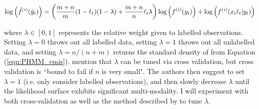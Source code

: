 \begin{equation}
    \log\left(\tilde{f}^{(i)}(\tilde{y}_t)\right) = \left(\frac{m+n}{m}(1-\ell_t)(1-\lambda) + \frac{m+n}{n}\ell_t\lambda\right)  \log\left(f^{(i)}(y_t)\right) + \log \left(f^{(i)}(x_t \ell_t|y_t)\right)
    \label{eqn:w_like}
\end{equation}

where $\lambda \in [0,1]$ represents the relative weight given to labelled observations. Setting $\lambda = 0$ throws out all labelled data, setting $\lambda = 1$ throws out all unlabelled data, and setting $\lambda = n/(n+m)$ returns the standard density of from Equation (\ref{eqn:PHMM_emis}). \citet{Chapelle:2006} mention that $\lambda$ can be tuned via cross validation, but cross validation is ``bound to fail if $n$ is very small". The authors then suggest to set $\lambda = 1$ (i.e. only consider labelled observations), and then slowly decrease $\lambda$ until the likelihood surface exhibits significant multi-modality. I will experiment with both cross-validation as well as the method described by \citet{Chapelle:2006} to tune $\lambda$.